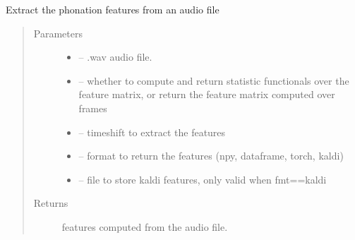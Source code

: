 \documentclass[letterpaper,10pt,english]{sphinxmanual}
\begin{document}
\begin{fulllineitems}
\begin{fulllineitems}
\label{\detokenize{Phonation:phonation.Phonation.extract_features_file}}
Extract the phonation features from an audio file
\begin{quote}\begin{description}
\item[{Parameters}] \leavevmode\begin{itemize}
\item {} 
 -- .wav audio file.

\item {} 
 -- whether to compute and return statistic functionals over the feature matrix, or return the feature matrix computed over frames

\item {} 
 -- timeshift to extract the features

\item {} 
 -- format to return the features (npy, dataframe, torch, kaldi)

\item {} 
 -- file to store kaldi features, only valid when fmt==\sphinxquotedblright{}kaldi\sphinxquotedblright{}

\end{itemize}

\item[{Returns}] \leavevmode
features computed from the audio file.

\end{description}\end{quote}


\end{fulllineitems}
\end{fulllineitems}
\end{document}
